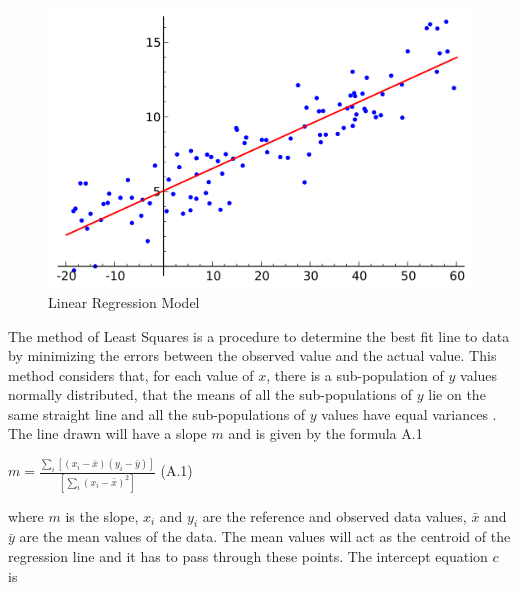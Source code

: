 \begin{figure}[h]
    \begin{center}
    \includegraphics[scale=0.25]{./images/figure9.png} 
    \end{center}
    \caption{Linear Regression Model \cite{regression}}
    \label{LRM}
  \end{figure}
  The method of Least Squares is a procedure to determine the best fit line to data\cite{S.Miller1992} by minimizing the errors between the observed value and the actual value. This method considers that, for each value of $x$, there is a sub-population of $y$ values normally distributed, that the means of all the sub-populations of $y$ lie on the same straight line and all the sub-populations of $y$ values have equal variances \cite{Almeida2002} \cite{daniel2018biostatistics}.
  The line drawn will have a slope $m$ and is given by the formula A.1
\begin{center}



      {\large  $ m = \frac{\sum_{i}[(x_i-\bar{x})(y_i-\bar{y})]}{[ \sum_{i}(x_i-\bar{x})^2 ]}$}  \hspace{3cm}(A.1)
  

   


\end{center}



where $m$ is the slope, $x_i$ and $y_i$ are the reference and observed data values, $\bar{x}$ and $\bar{y}$ are the mean values of the data. The mean values will act as the centroid of the regression line and it has to pass through these points.
The intercept equation $c$ is

